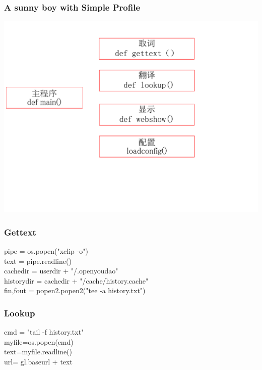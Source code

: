 \documentclass[10pt]{beamer}
\begin{document}
\begin{frame}
  \frametitle{A sunny boy with Simple Profile}
\begin{center} 
  \includegraphics[width=1.1\textwidth]{construct.pdf}

\end{center}

\end{frame}

\begin{frame}
  \frametitle{Gettext}
  pipe = os.popen("xclip -o") \\
  text = pipe.readline() \\
  cachedir = userdir + "/.openyoudao"\\
  historydir = cachedir + "/cache/history.cache"\\
  fin,fout = popen2.popen2("tee -a history.txt")\\


\end{frame}

\begin{frame}
  \frametitle{Lookup}
  
cmd = "tail -f history.txt"\\
myfile=os.popen(cmd)\\
text=myfile.readline()\\
url= gl.baseurl + text\\


\end{frame}
\end{document}

